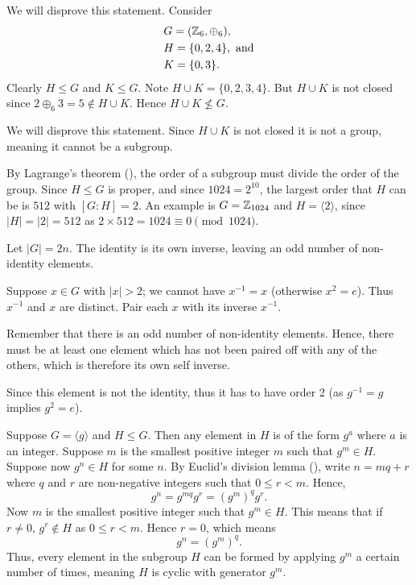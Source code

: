 \begin{questions}
\begin{partquestions}{\alph*}
        \item We will disprove this statement. Consider
        \begin{align*}
            &G = (\mathbb{Z}_6, \oplus_6),\\
            &H = \{0, 2, 4\},\text{ and}\\
            &K = \{0, 3\}.
        \end{align*}
        Clearly $H \leq G$ and $K \leq G$. Note $H \cup K = \{0, 2, 3, 4\}$. But $H \cup K$ is not closed since $2 \oplus_6 3 = 5 \not \in H \cup K$. Hence $H \cup K \not\leq G$.

        \item We will disprove this statement. Since $H \cup K$ is not closed it is not a group, meaning it cannot be a subgroup.
    \end{partquestions}

    \item By Lagrange's theorem (), the order of a subgroup must divide the order of the group. Since $H \leq G$ is proper, and since $1024 = 2^{10}$, the largest order that $H$ can be is $512$ with $[G:H] = 2$. An example is $G = \mathbb{Z}_{1024}$ and $H = \langle 2 \rangle$, since $|H| = |2| = 512$ as $2 \times 512 = 1024 \equiv 0 \pmod{1024}$.

    \item Let $|G| = 2n$. The identity is its own inverse, leaving an odd number of non-identity elements.

    Suppose $x \in G$ with $|x| > 2$; we cannot have $x^{-1} = x$ (otherwise $x^2 = e$). Thus $x^{-1}$ and $x$ are distinct. Pair each $x$ with its inverse $x^{-1}$.

    Remember that there is an odd number of non-identity elements. Hence, there must be at least one element which has not been paired off with any of the others, which is therefore its own self inverse.

    Since this element is not the identity, thus it has to have order 2 (as $g^{-1} = g$ implies $g^2 = e$).

    \item Suppose $G = \langle g \rangle$ and $H \leq G$. Then any element in $H$ is of the form $g^a$ where $a$ is an integer. Suppose $m$ is the smallest positive integer $m$ such that $g^m \in H$. Suppose now $g^n \in H$ for some $n$. By Euclid's division lemma (), write $n = mq + r$ where $q$ and $r$ are non-negative integers such that $0 \leq r < m$. Hence,
    \[
        g^n = g^{mq}g^r = (g^m)^q g^r.
    \]
    Now $m$ is the smallest positive integer such that $g^m \in H$. This means that if $r \neq 0$, $g^r \not\in H$ as $0 \leq r < m$. Hence $r = 0$, which means
    \[
        g^n = (g^m)^q.
    \]
    Thus, every element in the subgroup $H$ can be formed by applying $g^m$ a certain number of times, meaning $H$ is cyclic with generator $g^m$.


\end{questions}
